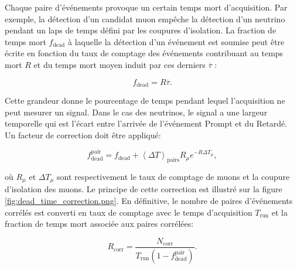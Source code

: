 Chaque paire d'événements provoque un certain temps mort d'acquisition. Par exemple, la détection d'un candidat muon empêche la détection d'un neutrino pendant un laps de temps défini par les coupures d'isolation. La fraction de temps mort $f_\textrm{dead}$ à laquelle la détection d'un événement est soumise peut être écrite en fonction du taux de comptage des événements contribuant au temps mort $R$ et du temps mort moyen induit par ces derniers $\overline{\tau}$ :

\begin{equation}
    f_\textrm{dead} = R\overline{\tau}.
\end{equation}

\bigbreak

Cette grandeur donne le pourcentage de temps pendant lequel l'acquisition ne peut mesurer un signal. Dans le cas des neutrinos, le signal a une largeur temporelle qui est l'écart entre l'arrivée de l'événement Prompt et du Retardé. Un facteur de correction doit être appliqué:

\begin{equation}
    f_\textrm{dead}^\textrm{pair} = f_\textrm{dead} + \left<\Delta T\right>_\textrm{pairs} R_\mu e^{-R \Delta T_\mu},
\end{equation}

\bigbreak

où $R_\mu$ et $\Delta T_\mu$ sont respectivement le taux de comptage de muons et la coupure d'isolation des muons. Le principe de cette correction est illustré sur la  figure \ref{fig:dead_time_correction.png}. En définitive, le nombre de paires d'événements corrélés est converti en taux de comptage avec le temps d'acquisition $T_\textrm{run}$ et la fraction de temps mort associée aux paires corrélées:

\begin{equation}
    R_\textrm{corr} = \frac{N_\textrm{corr}}{T_\textrm{run}\left(1 - f_\textrm{dead}^\textrm{pair} \right)}.
\end{equation}



